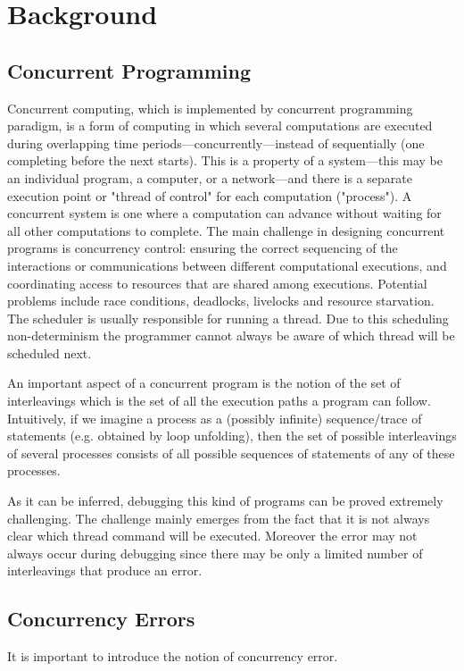 \chapter{Background}
\label{Chapter 2}

\section{Concurrent Programming}

Concurrent computing, which is implemented by concurrent programming paradigm, is a form of computing in which several 
computations are executed during overlapping time 
periods—concurrently—instead of sequentially (one completing before the next starts). 
This is a property of a system—this may be an individual program, a computer, or a network—and there is a separate execution point 
or "thread of control" for each computation ("process"). A concurrent system is one where a computation can advance without waiting for 
all other computations to complete.
The main challenge in designing concurrent programs is concurrency control: ensuring the correct sequencing of the 
interactions or communications between different computational executions, and coordinating access to resources that are shared among executions.
Potential problems include race conditions, deadlocks, livelocks and resource starvation. 
The scheduler is usually responsible for running a thread. Due to this scheduling non-determinism the programmer cannot always be aware of which thread
will be scheduled next.

An important aspect of a concurrent program is the notion of the set of interleavings which is the set of all the execution paths a program can follow.
Intuitively, if we imagine a process as a (possibly infinite) sequence/trace of statements (e.g. obtained by loop unfolding),
then the set of possible interleavings of several processes consists of all possible sequences of statements of any of these processes.

As it can be inferred, debugging this kind of programs can be proved extremely challenging. The challenge mainly emerges from the fact that it is 
not always clear which thread command will be executed. Moreover the error may not always occur during debugging since there may be only a limited
number of interleavings that produce an error. 

\section{Concurrency Errors}
It is important to introduce the notion of concurrency error.


